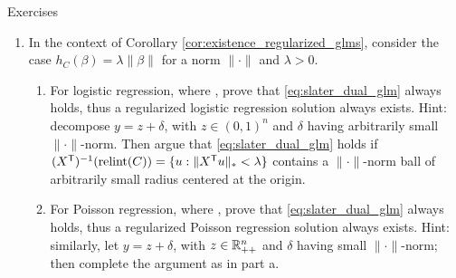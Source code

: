 \begin{xcb}{Exercises}
\begin{enumerate}[label=\thechapter.\arabic*]
\begin{enumerate}[label=\alph*.]
\item Prove that \eqref{eq:slater_dual_glm} is equivalent to the existence of $a
  \in (0,1)^n$ such that $X^\T (y - a) = 0$.

\item Prove that the condition from part a is equivalent to $\nul(X^\T 
  D_Y) \cap \R_{++}^n \not= \emptyset$, where we define $D_Y =
  \diag(Y_1,\dots,Y_n)$, for $Y = (Y_1,\dots,Y_n)$ with each $Y_i = 2y_i - 1 \in
  \{-1,1\}$.

\item Prove that the condition from part b is itself equivalent to $\col(D_Y X)
  \cap \R_+^n = \{0\}$. Hint: use Stiemke's lemma from Exercise 
  \ref{ex:stiemke_lemma}, with $A = X^\T D_Y$. 

\item Prove that the condition from part c is equivalent to
  \eqref{eq:existence_logistic}, concluding that part (ii) of Theorem
  \ref{thm:existence_glms} follows from Corollary
  \ref{cor:existence_regularized_glms}.  
\end{enumerate}

\item \label{ex:existence_regularized_glms}
  In the context of Corollary \ref{cor:existence_regularized_glms}, consider the
  case $h_C(\beta) = \lambda \|\beta\|$ for a norm $\|\cdot\|$ and $\lambda >
  0$.  

\begin{enumerate}[label=\alph*.]
\item For logistic regression, where , prove that \eqref{eq:slater_dual_glm} always holds,
  thus a regularized logistic regression solution always exists. Hint: decompose
  $y = z + \delta$, with $z \in (0,1)^n$ and $\delta$ having arbitrarily small 
  $\|\cdot\|$-norm. Then argue that \eqref{eq:slater_dual_glm} holds if
  $(X^{\mathsf{T}})^{-1} (\operatorname{relint}(C)) = \{ u : \|X^{\mathsf{T}} u\|_* < \lambda\}$ contains a
  $\|\cdot\|$-norm ball of arbitrarily small radius centered at the origin.  

\item For Poisson regression, where ,
  prove that \eqref{eq:slater_dual_glm} always holds, thus a regularized Poisson
  regression solution always exists. Hint: similarly, let $y = z + \delta$, with
  $z \in \mathbb{R}_{++}^n$ and $\delta$ having small $\|\cdot\|$-norm; then complete
  the argument as in part a.  
\end{enumerate}


\end{enumerate}
\end{xcb}